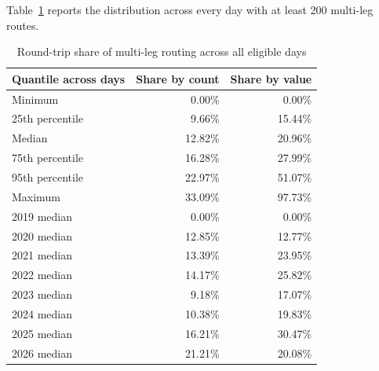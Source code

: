 Table~\ref{tab:app:roundtrip} reports the distribution across every day with at least 200 multi-leg routes.

\begin{table}[t]
\centering
\caption{Round-trip share of multi-leg routing across all eligible days}
\label{tab:app:roundtrip}
\begin{tabular}{lrr}
\toprule
Quantile across days & Share by count & Share by value \\
\midrule
Minimum & 0.00\% & 0.00\% \\
25th percentile & 9.66\% & 15.44\% \\
Median & 12.82\% & 20.96\% \\
75th percentile & 16.28\% & 27.99\% \\
95th percentile & 22.97\% & 51.07\% \\
Maximum & 33.09\% & 97.73\% \\
\midrule
2019 median & 0.00\% & 0.00\% \\
2020 median & 12.85\% & 12.77\% \\
2021 median & 13.39\% & 23.95\% \\
2022 median & 14.17\% & 25.82\% \\
2023 median & 9.18\% & 17.07\% \\
2024 median & 10.38\% & 19.83\% \\
2025 median & 16.21\% & 30.47\% \\
2026 median & 21.21\% & 20.08\% \\
\bottomrule
\end{tabular}
\end{table}

